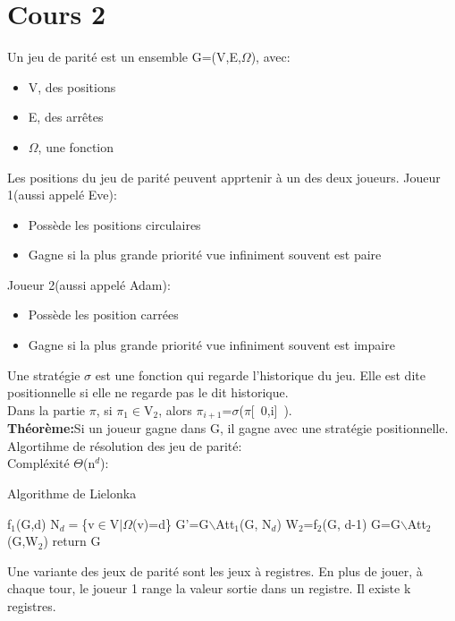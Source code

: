 \section{Cours 2}
Un jeu de parit\'e est un ensemble G=(V,E,$\Omega$), avec:
\begin{itemize}
  \item V, des positions
  \item E, des arr\^etes
  \item $\Omega$, une fonction
\end{itemize}
Les positions du jeu de parit\'e peuvent apprtenir \`a un des deux joueurs.
Joueur 1(aussi appel\'e Eve):
\begin{itemize}
  \item Poss\`ede les positions circulaires
  \item Gagne si la plus grande priorit\'e vue infiniment souvent est paire
\end{itemize}
Joueur 2(aussi appel\'e Adam):
\begin{itemize}
  \item Poss\`ede les position carr\'ees
  \item Gagne si la plus grande priorit\'e vue infiniment souvent est impaire
\end{itemize}
Une strat\'egie $\sigma$ est une fonction qui regarde l'historique du jeu. Elle est dite positionnelle si elle ne
regarde pas le dit historique.\\
Dans la partie $\pi$, si $\pi_1\in$V$_2$, alors $\pi_{i+1}$=$\sigma$($\pi$[ \,0,i] \,).\\
\medskip
\textbf{Th\'eor\`eme:}Si un joueur gagne dans G, il gagne avec une strat\'egie positionnelle.\\
\medskip
Algortihme de r\'esolution des jeu de parit\'e:\\
Compl\'exit\'e $\Theta$(n$^d$):\\
\begin{algorithm}
  \caption{Algorithme de Lielonka}
  \begin{algorithmic}
  \STATE f$_1$(G,d)
  \REPEAT
    \STATE N$_d=$\{v$\in$V$\mid\Omega$(v)=d\}
    \STATE G'=G$\backslash$Att$_1$(G, N$_d$)
    \STATE W$_2$=f$_2$(G, d-1)
    \STATE G=G$\backslash$Att$_2$(G,W$_2$)
  \STATE return G
  \end{algorithmic}
\end{algorithm}
\medskip
Une variante des jeux de parit\'e sont les jeux \`a registres. En plus de jouer, \`a chaque tour, le joueur 1 range la
valeur sortie dans un registre. Il existe k registres.\\
